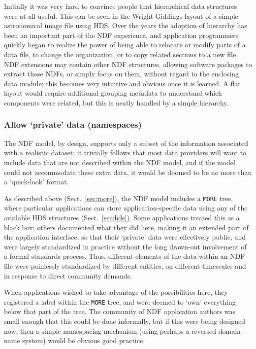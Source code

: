 \documentclass[final,authoryear,5p,times,twocolumn]{elsarticle}
\newcommand*\secref[1]{Sect.~\ref{#1}}
\begin{document}
Initially it was very hard to convince people that hierarchical data
structures were at all useful. This can be seen in the Wright-Giddings
layout of a simple astronomical image file using HDS. Over the years
the adoption of hierarchy has been an important part of the NDF
experience, and application programmers quickly began to realize the power of
being able to relocate or modify parts of a data file,
to change the organization, or to copy related sections to a new file.
NDF extensions may contain other NDF structures, allowing
software packages to extract those NDFs, or simply focus on them,
without regard to the enclosing data module; this becomes very intuitive and
obvious once it is learned. A flat layout would require additional
grouping metadata to understand which components were related, but this
is neatly handled by a simple hierarchy.

\subsubsection{Allow `private' data (namespaces)}

The NDF model, by design, supports only a subset of the information
associated with a realistic dataset; it trivially follows that most
data providers will want to include data that are not described within
the NDF model, and if the model could not accommodate these extra data,
it would be doomed to be no more than a `quick-look' format.

As described above (\secref{sec:more}), the NDF model includes a
\texttt{MORE} tree, where particular applications can store
application-specific data using any of the available HDS structures
(\secref{sec:hds}).  Some applications treated this as a black box;
others documented what they did here, making it an extended part of
the application interface, so that their `private' data were effectively
public, and were largely standardized in practice without the long
drawn-out involvement of a formal standards process.  Thus, different
elements of the data within an NDF file were painlessly standardized
by different entities, on different timescales and in response to
direct community demands.

When applications wished to take advantage of the possibilities here,
they registered a label within the \texttt{MORE} tree, and were deemed
to `own' everything below that part of the tree.  The community of NDF
application authors was small enough that this could be done
informally, but if this were being designed now, then a simple
namespacing mechanism (using perhaps a reversed-domain-name system)
would be obvious good practice.
\end{document}
